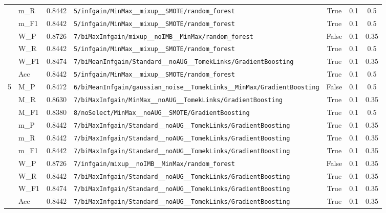 \begin{table}[htbp]
\begin{tabular}{|c|l|c|>{\ttfamily\footnotesize}p{7.2cm}|c|c|c|}
 & m\_R & 0.8442 & \texttt{5/infgain/MinMax\_\_mixup\_\_SMOTE/random\_forest} & True & 0.1 & 0.5 \\
 & m\_F1 & 0.8442 & \texttt{5/infgain/MinMax\_\_mixup\_\_SMOTE/random\_forest} & True & 0.1 & 0.5 \\
 & W\_P & 0.8726 & \texttt{7/biMaxInfgain/mixup\_\_noIMB\_\_MinMax/random\_forest} & False & 0.1 & 0.35 \\
 & W\_R & 0.8442 & \texttt{5/infgain/MinMax\_\_mixup\_\_SMOTE/random\_forest} & True & 0.1 & 0.5 \\
 & W\_F1 & 0.8474 & \texttt{7/biMeanInfgain/Standard\_\_noAUG\_\_TomekLinks/GradientBoosting} & True & 0.1 & 0.35 \\
 & Acc & 0.8442 & \texttt{5/infgain/MinMax\_\_mixup\_\_SMOTE/random\_forest} & True & 0.1 & 0.5 \\
\hline
\multirow{10}{*}{5} & M\_P & 0.8472 & \texttt{6/biMeanInfgain/gaussian\_noise\_\_TomekLinks\_\_MinMax/GradientBoosting} & False & 0.1 & 0.5 \\
 & M\_R & 0.8630 & \texttt{7/biMaxInfgain/MinMax\_\_noAUG\_\_TomekLinks/GradientBoosting} & True & 0.1 & 0.35 \\
 & M\_F1 & 0.8380 & \texttt{8/noSelect/MinMax\_\_noAUG\_\_SMOTE/GradientBoosting} & True & 0.1 & 0.5 \\
 & m\_P & 0.8442 & \texttt{7/biMaxInfgain/Standard\_\_noAUG\_\_TomekLinks/GradientBoosting} & True & 0.1 & 0.35 \\
 & m\_R & 0.8442 & \texttt{7/biMaxInfgain/Standard\_\_noAUG\_\_TomekLinks/GradientBoosting} & True & 0.1 & 0.35 \\
 & m\_F1 & 0.8442 & \texttt{7/biMaxInfgain/Standard\_\_noAUG\_\_TomekLinks/GradientBoosting} & True & 0.1 & 0.35 \\
 & W\_P & 0.8726 & \texttt{7/infgain/mixup\_\_noIMB\_\_MinMax/random\_forest} & False & 0.1 & 0.35 \\
 & W\_R & 0.8442 & \texttt{7/biMaxInfgain/Standard\_\_noAUG\_\_TomekLinks/GradientBoosting} & True & 0.1 & 0.35 \\
 & W\_F1 & 0.8474 & \texttt{7/biMaxInfgain/Standard\_\_noAUG\_\_TomekLinks/GradientBoosting} & True & 0.1 & 0.35 \\
 & Acc & 0.8442 & \texttt{7/biMaxInfgain/Standard\_\_noAUG\_\_TomekLinks/GradientBoosting} & True & 0.1 & 0.35 \\
\hline
\end{tabular}
\end{table}